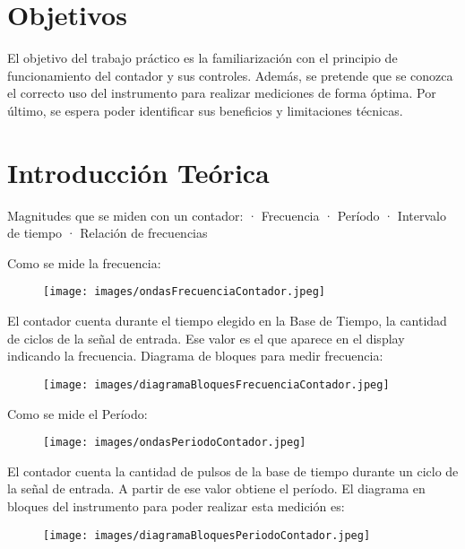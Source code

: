 \documentclass{article}
\begin{document}
\section{Objetivos}

	El objetivo del trabajo práctico es la familiarización con el principio de funcionamiento del contador y sus controles. Además, se pretende que se conozca el correcto uso del instrumento para realizar mediciones de forma óptima. Por último, se espera poder identificar sus beneficios y limitaciones técnicas.
\bigskip\bigskip




\section{Introducción Teórica}

	Magnitudes que se miden con un contador:
	· Frecuencia
	· Período
	· Intervalo de tiempo
	· Relación de frecuencias
	
	
	Como se mide la frecuencia:
	
		\begin{figure}[h]
			\centering
			\texttt{[image: images/ondasFrecuenciaContador.jpeg]}
			\medskip
		\end{figure}
		\bigskip\bigskip

	El contador cuenta durante el tiempo elegido en la Base de Tiempo, la cantidad de ciclos de la señal de entrada. Ese valor es el que aparece en el display indicando la frecuencia.
	\medskip
	Diagrama de bloques para medir frecuencia:
	
	\begin{figure}[h]
				\centering
				\texttt{[image: images/diagramaBloquesFrecuenciaContador.jpeg]}
				\medskip
	\end{figure}
	\bigskip\bigskip
	
	Como se mide el Período:
		
	\begin{figure}[h]
		\centering
		\texttt{[image: images/ondasPeriodoContador.jpeg]}
		\medskip
	\end{figure}
	\bigskip\bigskip
	
	El contador cuenta la cantidad de pulsos de la base de tiempo durante un ciclo de la señal de entrada. A partir de ese valor obtiene el período.
	\medskip
	El diagrama en bloques del instrumento para poder realizar esta medición es:
		
		
	\begin{figure}[h]
		\centering
		\texttt{[image: images/diagramaBloquesPeriodoContador.jpeg]}
		\medskip
	\end{figure}
	\bigskip\bigskip
	
\end{document}
